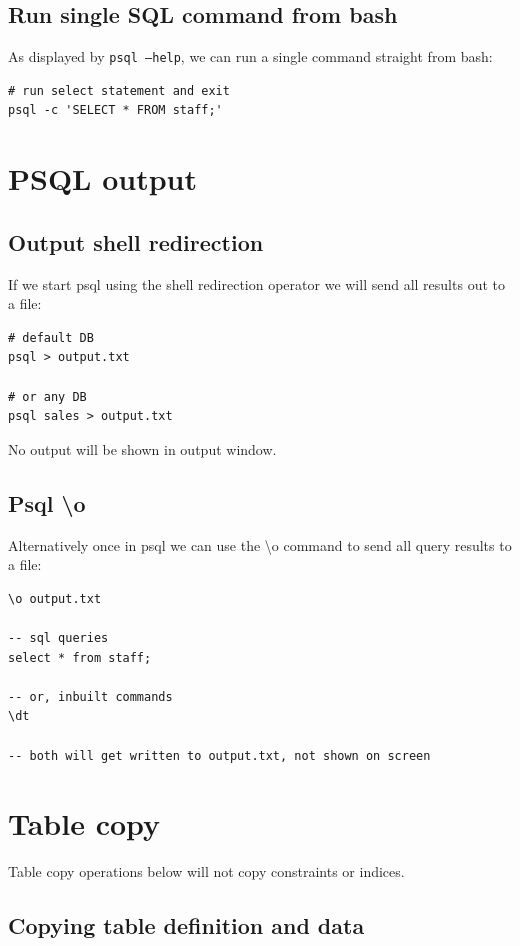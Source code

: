 \documentclass{pgnotes}
\begin{document}
\subsection{Run single SQL command from bash}

As displayed by \texttt{psql --help}, we can run a single command straight from bash:
\begin{verbatim}
# run select statement and exit
psql -c 'SELECT * FROM staff;' 
\end{verbatim}

\section{PSQL output}

\subsection{Output shell redirection}

If we start psql using the shell redirection operator we will send all results out to a file:
\begin{verbatim}
# default DB
psql > output.txt

# or any DB 
psql sales > output.txt
\end{verbatim}
No output will be shown in output window. 

\subsection{Psql \textbackslash o}

Alternatively once in psql we can use the \textbackslash o command to send all query results to a file:
\begin{verbatim}
\o output.txt

-- sql queries
select * from staff;

-- or, inbuilt commands
\dt

-- both will get written to output.txt, not shown on screen
\end{verbatim}

\section{Table copy}

Table copy operations below will not copy constraints or indices.

\subsection{Copying table definition and data}
\end{document}
